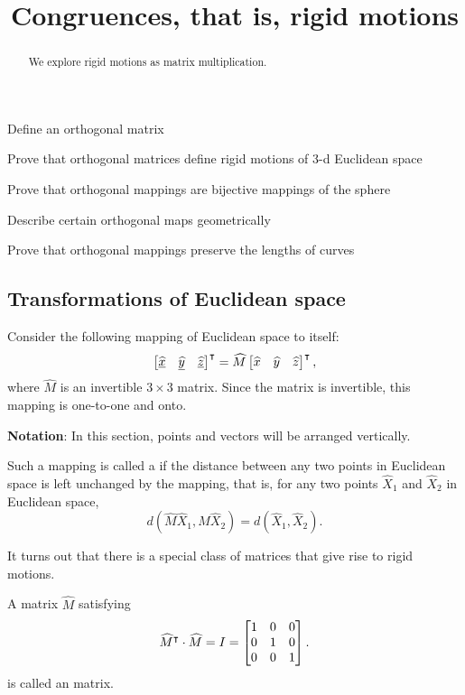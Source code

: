 \documentclass[newpage,hints,handout]{ximera}
\title{Congruences, that is, rigid motions}
\begin{document}
\begin{abstract}
We explore rigid motions as matrix multiplication.
\end{abstract}
\maketitle

\begin{listOutcomes}
 \item Define an orthogonal matrix
 \item Prove that orthogonal matrices define rigid motions of 3-d Euclidean space
 \item Prove that orthogonal mappings are bijective mappings of the sphere
 \item Describe certain orthogonal maps geometrically
\item Prove that orthogonal mappings preserve the lengths of curves
\end{listOutcomes}

\subsection*{Transformations of Euclidean space}

Consider the following mapping of Euclidean space to itself:%
\[
\begin{bmatrix}
\underline{\hat{x}} & \underline{\hat{y}} & \underline{\hat{z}}%
\end{bmatrix}^\transpose
=\hat M \begin{bmatrix} \hat{x} & \hat{y} & \hat{z}\end{bmatrix}^\transpose,
\]
where $\hat{M}$ is an invertible $3\times3$ matrix. Since the matrix
is invertible, this mapping is one-to-one and onto.

\textbf{Notation}: In this section, points and vectors will be arranged
vertically.

\begin{definition}
  Such a mapping is called a  if the distance between any two
  points in Euclidean space is left unchanged by the mapping, that is, for
  any two points $\hat{X}_{1}$ and $\hat{X}_{2}$ in Euclidean space,%
  \[
  d(\hat{M}\hat{X}_{1},\hat M\hat{X}_{2})=d(\hat{X}_{1},\hat{X}_{2}).
  \]
\end{definition}

It turns out that there is a special class of matrices that give rise
to rigid motions.

\begin{definition}
  A matrix $\hat{M}$ satisfying
  \[
  \widehat{M}^\intercal\cdot\widehat{M}=I=\begin{bmatrix}
  1 & 0 & 0\\
  0 & 1 & 0\\
  0 & 0 & 1
  \end{bmatrix}.
  \]
  is called an  matrix.
\end{definition}
\end{document}
